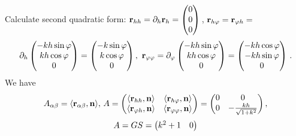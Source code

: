 \documentclass[12pt]{article}
\theoremstyle{theorem}
\numberwithin{equation}{section}
\begin{document}
{\begin{equation}
    \end{equation}
Calculate   second quadratic form:  $\r_{hh}=\p_h\r_h=
  \begin{pmatrix}
        0\\
        0\\
        0\\
   \end{pmatrix}\,$, $\r_{h\varphi}=\r_{\varphi h}=$
             $$
             \p_h
       \begin{pmatrix}
        -kh\sin\varphi\\
        kh\cos\varphi\\
          0\\
   \end{pmatrix}=\begin{pmatrix}
        -k\sin\varphi\\
        k\cos\varphi\\
          0\\
   \end{pmatrix},\,\,
   \r_{\varphi \varphi}=\p_\varphi
       \begin{pmatrix}
        -kh\sin\varphi\\
        kh\cos\varphi\\
          0\\
   \end{pmatrix}=\begin{pmatrix}
        -kh\cos\varphi\\
        -kh\sin\varphi\\
          0\\
   \end{pmatrix}\,.
                      $$
We have
                    \begin{equation}\label{secquadrformforcylinder}
            A_{\alpha\beta}=\langle{\bf r}_{\alpha\beta},{\bf n}\rangle,\,
              A=\begin{pmatrix}\langle{\bf r}_{hh},{\bf n}\rangle&\langle{\bf r}_{h\varphi},{\bf n}\rangle\cr
                               \langle{\bf r}_{\varphi h},{\bf n}\rangle &\langle{\bf r}_{\varphi\varphi},{\bf n}\rangle\cr
                                   \end{pmatrix}=
                                   \begin{pmatrix}0&0\cr
                                0&-{kh\over {\sqrt {1+k^2}}}\cr
                                   \end{pmatrix},
                    \end{equation}
                    $$
       A=GS=\begin{pmatrix}k^2+1&0\cr

\end{pmatrix}$$}
\end{document}
